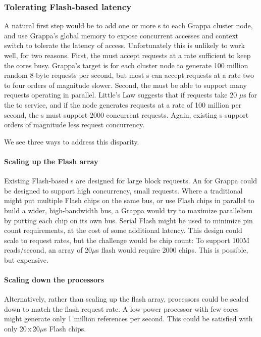 \subsubsection{Tolerating Flash-based  latency} 
A natural first step would be to add one or more s to each Grappa
cluster node, and use Grappa's global memory  to expose concurrent
accesses and context switch to tolerate the latency of 
access. Unfortunately this is unlikely to work well, for two
reasons. First, the  must accept requests at a rate sufficient to
keep the cores busy. Grappa's target is for each cluster node to
generate 100 million random 8-byte requests per second, but most s
can accept requests at a rate two to four orders of magnitude slower.
Second, the  must be able to support many requests operating in
parallel. Little's Law suggests that if requests take 20 $\mu$s for
the  to service, and if the node generates requests at a rate of
100 million per second, the s must support 2000 concurrent
requests. Again, existing s support orders of magnitude less request concurrency.

We see three ways to address this disparity.
\paragraph{Scaling up the Flash array}
Existing Flash-based s are designed for large block requests. An
 for Grappa could be designed to support high concurrency, small
requests. Where a traditional  might put multiple Flash chips on
the same bus, or use Flash chips in parallel to build a wider,
high-bandwidth bus, a Grappa  would try to maximize parallelism by
putting each chip on its own bus. Serial Flash might be used to
minimize pin count requirements, at the cost of some additional
latency. This design could scale to request rates, but the challenge
would be chip count: To support 100M reads/second, an array of
20$\mu$s flash would require 2000 chips. This is possible, but expensive.

\paragraph{Scaling down the processors}
Alternatively, rather than scaling up the flash array, processors
could be scaled down to match the flash request rate. A low-power
processor with few cores might generate only 1 million references per
second. This could be satisfied with only 20\,x\,20$\mu$s Flash chips.

